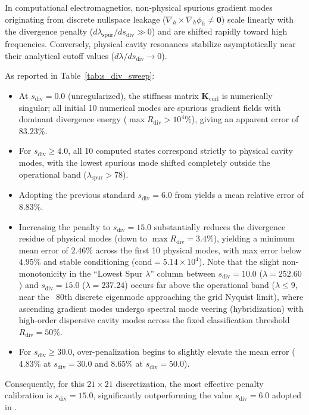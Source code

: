 \documentclass[VANCOUVER,Times1COL]{WileyNJD-v5}
\begin{document}
In computational electromagnetics, non-physical spurious gradient modes originating from discrete nullspace leakage ($\nabla_h \times \nabla_h \phi_h \neq \mathbf{0}$) scale linearly with the divergence penalty ($d\lambda_{\mathrm{spur}} / ds_{\mathrm{div}} \gg 0$) and are shifted rapidly toward high frequencies. Conversely, physical cavity resonances stabilize asymptotically near their analytical cutoff values ($d\lambda / ds_{\mathrm{div}} \to 0$).

As reported in Table~\ref{tab:s_div_sweep}:
\begin{itemize}
    \item At $s_{\mathrm{div}} = 0.0$ (unregularized), the stiffness matrix $\mathbf{K}_{\mathrm{curl}}$ is numerically singular; all initial 10 numerical modes are spurious gradient fields with dominant divergence energy ($\max R_{\mathrm{div}} > 10^4\%$), giving an apparent error of $83.23\%$.
    \item For $s_{\mathrm{div}} \ge 4.0$, all 10 computed states correspond strictly to physical cavity modes, with the lowest spurious mode shifted completely outside the operational band ($\lambda_{\mathrm{spur}} > 78$).
    \item Adopting the previous standard $s_{\mathrm{div}} = 6.0$ from \cite{stable_vnmm2d_2026} yields a mean relative error of $8.83\%$.
    \item Increasing the penalty to $s_{\mathrm{div}} = 15.0$ substantially reduces the divergence residue of physical modes (down to $\max R_{\mathrm{div}} = 3.4\%$), yielding a minimum mean error of $\mathbf{2.46\%}$ across the first 10 physical modes, with max error below $4.95\%$ and stable conditioning ($\mathrm{cond} = 5.14 \times 10^4$). Note that the slight non-monotonicity in the ``Lowest Spur $\lambda$'' column between $s_{\mathrm{div}} = 10.0$ ($\lambda = 252.60$) and $s_{\mathrm{div}} = 15.0$ ($\lambda = 237.24$) occurs far above the operational band ($\lambda \le 9$, near the ~80th discrete eigenmode approaching the grid Nyquist limit), where ascending gradient modes undergo spectral mode veering (hybridization) with high-order dispersive cavity modes across the fixed classification threshold $R_{\mathrm{div}} = 50\%$.
    \item For $s_{\mathrm{div}} \ge 30.0$, over-penalization begins to slightly elevate the mean error ($4.83\%$ at $s_{\mathrm{div}} = 30.0$ and $8.65\%$ at $s_{\mathrm{div}} = 50.0$).
\end{itemize}
Consequently, for this $21 \times 21$ discretization, the most effective penalty calibration is $s_{\mathrm{div}} = 15.0$, significantly outperforming the value $s_{\mathrm{div}} = 6.0$ adopted in \cite{stable_vnmm2d_2026}.
\end{document}
